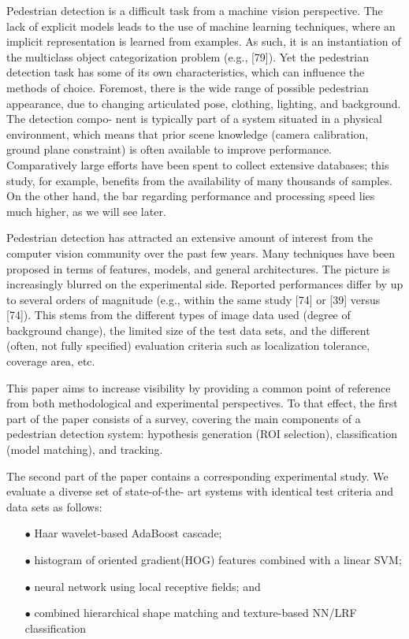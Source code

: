 Pedestrian detection is a difficult task from a machine
vision perspective. The lack of explicit models leads to the
use of machine learning techniques, where an implicit
representation is learned from examples. As such, it is an
instantiation of the multiclass object categorization problem
(e.g., [79]). Yet the pedestrian detection task has some of its
own characteristics, which can influence the methods of
choice. Foremost, there is the wide range of possible
pedestrian appearance, due to changing articulated pose,
clothing, lighting, and background. The detection compo-
nent is typically part of a system situated in a physical
environment, which means that prior scene knowledge
(camera calibration, ground plane constraint) is often
available to improve performance. Comparatively large
efforts have been spent to collect extensive databases; this
study, for example, benefits from the availability of many
thousands of samples. On the other hand, the bar regarding
performance and processing speed lies much higher, as we
will see later.

Pedestrian detection has attracted an extensive amount of
interest from the computer vision community over the past
few years. Many techniques have been proposed in terms of
features, models, and general architectures. The picture is
increasingly blurred on the experimental side. Reported
performances differ by up to several orders of magnitude
(e.g., within the same study [74] or [39] versus [74]). This
stems from the different types of image data used (degree of
background change), the limited size of the test data sets, and
the different (often, not fully specified) evaluation criteria
such as localization tolerance, coverage area, etc.

This paper aims to increase visibility by providing a
common point of reference from both methodological and
experimental perspectives. To that effect, the first part of the
paper consists of a survey, covering the main components of a
pedestrian detection system: hypothesis generation (ROI
selection), classification (model matching), and tracking.

The second part of the paper contains a corresponding
experimental study. We evaluate a diverse set of state-of-the-
art systems with identical test criteria and data sets as follows:
\begin{enumerate}
\item[$\bullet$] Haar wavelet-based AdaBoost cascade;
\item[$\bullet$] histogram of oriented gradient(HOG) features combined with a linear SVM;
\item[$\bullet$] neural network using local receptive fields; and
\item[$\bullet$] combined hierarchical shape matching and texture-based NN/LRF classification
\end{enumerate}

